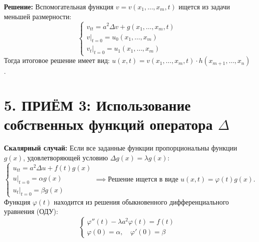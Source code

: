 \noindent\textbf{Решение:} Вспомогательная функция $v = v(x_1, \dots, x_m, t)$ ищется из задачи меньшей размерности: 
\[
\begin{cases} 
v_{tt} = a^2 \Delta v + g(x_1, \dots, x_m, t) \\ 
v|_{t=0} = u_0(x_1, \dots, x_m) \\ 
v_t|_{t=0} = u_1(x_1, \dots, x_m) 
\end{cases}
\]
Тогда итоговое решение имеет вид: $u(x, t) = v(x_1, \dots, x_m, t) \cdot h(x_{m+1}, \dots, x_n)$.

\section{5. ПРИЁМ 3: Использование собственных функций оператора $\Delta$}
\textbf{Скалярный случай:} Если все заданные функции пропорциональны функции $g(x)$, удовлетворяющей условию $\Delta g(x) = \lambda g(x)$: 
\[
\begin{cases} 
u_{tt} = a^2 \Delta u + f(t)g(x) \\ 
u|_{t=0} = \alpha g(x) \\ 
u_t|_{t=0} = \beta g(x) 
\end{cases} 
\implies \text{Решение ищется в виде } u(x,t) = \varphi(t)g(x).
\]
Функция $\varphi(t)$ находится из решения обыкновенного дифференциального уравнения (ОДУ):
\[
\begin{cases} 
\varphi''(t) - \lambda a^2 \varphi(t) = f(t) \\ 
\varphi(0) = \alpha, \quad \varphi'(0) = \beta 
\end{cases}
\]

